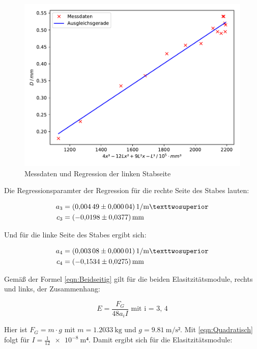 \begin{figure}
  \centering
  \includegraphics[scale=0.8]{content/plot4.pdf}
  \caption{Messdaten und Regression der linken Stabseite}
  \label{fig:plot4}
\end{figure}

Die Regressionsparamter der Regression für die rechte Seite des Stabes
lauten:

\begin{align*}
a_3 &= \SI{0.00449+-0.00004}{1\per\meter²}\\
c_3 &= \SI{-0.0198+-0.0377}{\milli\meter}
\end{align*}

Und für die linke Seite des Stabes ergibt sich: 

\begin{align*}
a_4 &= \SI{0.00308+-0.00001}{1\per\meter²}\\
c_4 &= \SI{-0.1534+-0.0275}{\milli\meter}
\end{align*}

Gemäß der Formel \eqref{eqn:Beidseitig} gilt für die beiden Elasitzitätsmodule, rechts und links, 
der Zusammenhang: 

\begin{equation*}
E = \frac{F_G}{48a_iI} \text{ mit i = 3, 4}
\end{equation*}

Hier ist $F_G = m\cdot g$ mit $m = \SI{1.2033}{\kilo\gram}$ und $g = \SI{9.81}{\meter\per\second²}$.
Mit \eqref{eqn:Quadratisch} folgt für $I = \frac{1}{12}\SI{e-8}{\meter⁴}$. Damit 
ergibt sich für die Elasitzitätsmodule: 

